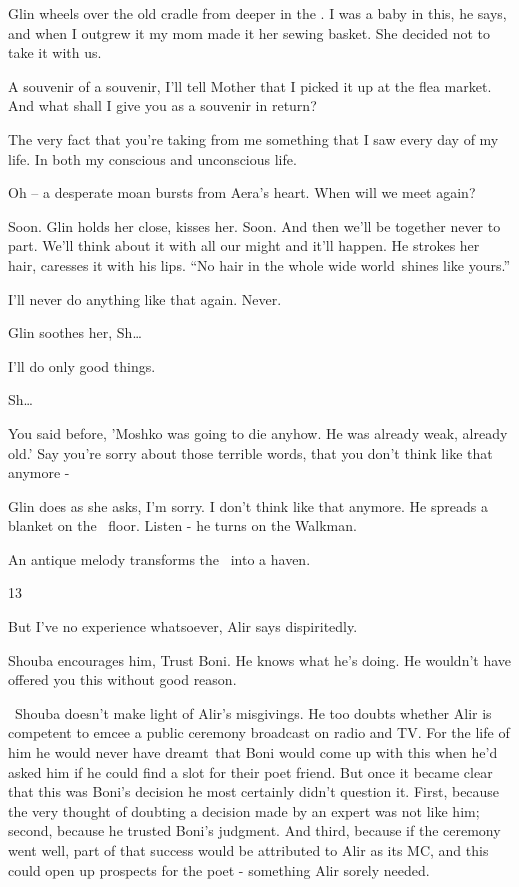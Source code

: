 \documentclass[12pt]{book}
\begin{document}
Glin wheels over the old cradle from deeper in the . {\textquotedbl}I was a baby in this,{\textquotedbl} he says,
{\textquotedbl}and when I outgrew it my mom made it her sewing basket. She decided not to take it with
us.{\textquotedbl}

{\textquotedbl}A souvenir of a souvenir, I'll tell Mother that I picked it up at the flea market. And what shall I give
you as a souvenir in return?{\textquotedbl}

{\textquotedbl}The very fact that you're taking from me something that I saw every day of my life. In both my conscious
and unconscious life.{\textquotedbl}

{\textquotedbl}Oh -- {\textquotedbl} a desperate moan bursts from Aera's heart. {\textquotedbl}When will we meet
again?{\textquotedbl}

{\textquotedbl}Soon.{\textquotedbl} Glin holds her close, kisses her. {\textquotedbl}Soon. And then we'll be together
never to part. We'll think about it with all our might and it'll happen.{\textquotedbl} He strokes her hair, caresses
it with his lips. ``No hair in the whole wide world~shines like yours.''

{\textquotedbl}I'll never do anything like that again. Never.{\textquotedbl}

Glin soothes her, {\textquotedbl}Sh{\dots}{\textquotedbl}~

{\textquotedbl}I'll do only good things.{\textquotedbl}

{\textquotedbl}Sh{\dots}{\textquotedbl}

{\textquotedbl}You said before, 'Moshko was going to die anyhow. He was already weak, already old.' Say you're sorry
about those terrible words, that you don't think like that anymore -{\textquotedbl}

Glin does as she asks, {\textquotedbl}I'm sorry. I don't think like that anymore.{\textquotedbl} He spreads a blanket on
the \ floor. {\textquotedbl}Listen -{\textquotedbl} he turns on the Walkman.

An antique melody transforms the \ into a haven.


\bigskip

13

{\textquotedbl}But I've no experience whatsoever,{\textquotedbl} Alir says dispiritedly.

Shouba encourages him, {\textquotedbl}Trust Boni. He knows what he's doing. He wouldn't have offered you this without
good reason.{\textquotedbl}

~Shouba doesn't make light of Alir's misgivings. He too doubts whether Alir is competent to emcee a public ceremony
broadcast on radio and TV. For the life of him he would never have dreamt~that Boni would come up with this when he'd
asked him if he could find a slot for their poet friend. But once it became clear that this was Boni's decision he most
certainly didn't question it. First, because the very thought of doubting a decision made by an expert was not like
him; second, because he trusted Boni's judgment. And third, because if the ceremony went well, part of that success
would be attributed to Alir as its MC, and this could open up prospects for the poet - something Alir sorely needed.
\end{document}
